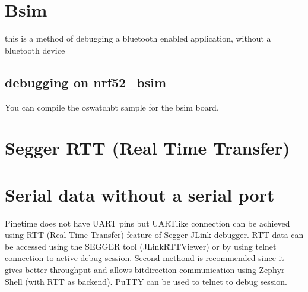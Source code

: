 \documentclass[letterpaper,10pt,english]{sphinxmanual}
\begin{document}
\begin{sphinxVerbatim}[commandchars=\\\{\}]
\end{sphinxVerbatim}


\section{Bsim}
\label{\detokenize{debugging/bsim:bsim}}\label{\detokenize{debugging/bsim::doc}}
this is a method of debugging a bluetooth enabled application, without a bluetooth device


\subsection{debugging on nrf52\_bsim}
\label{\detokenize{debugging/bsim:debugging-on-nrf52-bsim}}
You can compile the oswatch\sphinxhyphen{}bt sample for the bsim board.

\begin{sphinxVerbatim}[commandchars=\\\{\}]
     

 
     
  
\end{sphinxVerbatim}


\section{Segger RTT (Real Time Transfer)}
\label{\detokenize{debugging/jlink:segger-rtt-real-time-transfer}}\label{\detokenize{debugging/jlink::doc}}

\section{Serial data without a serial port}
\label{\detokenize{debugging/jlink:serial-data-without-a-serial-port}}
Pinetime does not have UART pins but UART\sphinxhyphen{}like connection can be achieved using RTT (Real Time Transfer)
feature of Segger JLink debugger. RTT data can be accessed using the SEGGER tool (JLinkRTTViewer) or by using
telnet connection to active debug session. Second methond is recommended since it gives better throughput
and allows bitdirection communication using Zephyr Shell (with RTT as backend). PuTTY can be used to
telnet to debug session.
\end{document}
